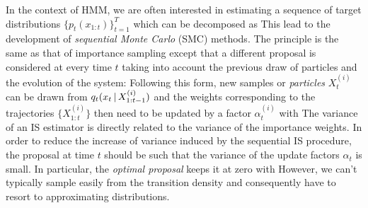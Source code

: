 In the context of HMM, we are often interested in estimating a sequence of target distributions $\{p_{t}(x_{1:t})\}_{t=1}^{T}$ which can be decomposed as 
%
%
This lead to the development of \emph{sequential Monte Carlo} (SMC) methods. The principle is the same as that of importance sampling except that a different proposal is considered at every time $t$ taking into account the previous draw of particles and the evolution of the system:
%
%
Following this form, new samples or \emph{particles} $X^{(i)}_t$ can be drawn from $q_{t}(x_{t}\,|\, X^{(i)}_{1:t-1})$ and the weights corresponding to the trajectories $\{X^{(i)}_{1:t}\}$ then need to be updated by a factor $\alpha^{(i)}_{t}$ with
%
%
The variance of an IS estimator is directly related to the variance of the importance weights. In order to reduce the increase of variance induced by the sequential IS procedure, the proposal at time $t$ should be such that the variance of the update factors $\alpha_t$ is small. In particular, the \emph{optimal proposal} keeps it at zero with
However, we can't typically sample easily from the transition density and consequently have to resort to approximating distributions. 

